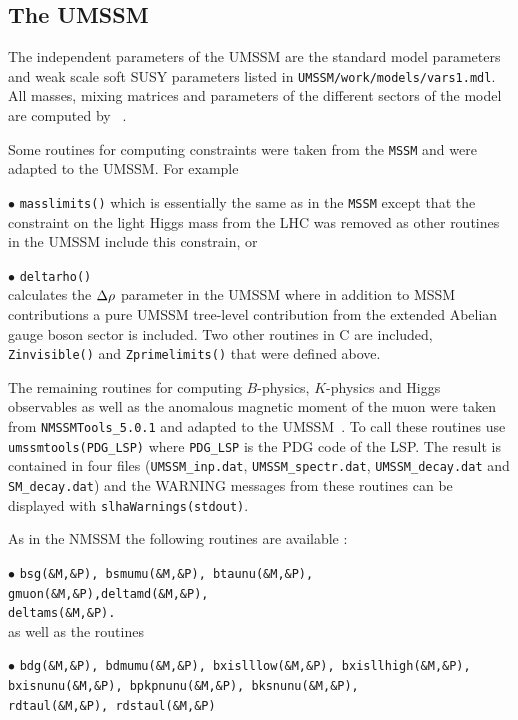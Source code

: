 \documentclass[12pt,a4paper]{article}
\begin{document}
\subsection{The UMSSM}

The independent parameters of the UMSSM are the standard model
parameters and weak scale soft SUSY parameters listed in \verb|UMSSM/work/models/vars1.mdl|.
All  masses, mixing matrices and parameters of the different sectors of the model
are computed by \micro~\cite{DaSilva:2013jga,Belanger:2015cra}.

Some routines for computing constraints were taken from the {\tt MSSM} and were adapted to the UMSSM. For example

 \noi$\bullet$ \verb|masslimits()|
which is essentially the same as in the {\tt MSSM} except that
the constraint on the light Higgs mass from the LHC was removed
as other routines in the UMSSM include this constrain, or

\noi$\bullet$ \verb|deltarho()|\\
 calculates  the $\Delta\rho$ parameter in the UMSSM where in addition to MSSM contributions
a pure UMSSM tree-level contribution from the extended Abelian gauge boson sector is included.
Two other routines in C are included, \verb|Zinvisible()| and \verb|Zprimelimits()| that were defined above. 


The remaining routines for computing $B$-physics, $K$-physics and Higgs observables as well as the anomalous magnetic moment of the muon
were taken from \verb|NMSSMTools_5.0.1| and adapted to the UMSSM~\cite{DaSilva:2013jga,Domingo:2015wyn}.
To call these routines use \verb|umssmtools(PDG_LSP)| where \verb|PDG_LSP| is the PDG code of the LSP. The result is contained in four files (\verb|UMSSM_inp.dat|,
\verb|UMSSM_spectr.dat|, \verb|UMSSM_decay.dat| and \verb|SM_decay.dat|) and the WARNING messages from these routines
can be displayed with \verb|slhaWarnings(stdout)|.

As in the NMSSM the following routines are available :

\noindent
$\bullet$ {\tt bsg(\&M,\&P), bsmumu(\&M,\&P), btaunu(\&M,\&P),  gmuon(\&M,\&P),deltamd(\&M,\&P),}\\
{\tt deltams(\&M,\&P).}\\ 

\noindent as well as the routines

\noindent
$\bullet$ {\tt bdg(\&M,\&P), bdmumu(\&M,\&P), bxislllow(\&M,\&P), bxisllhigh(\&M,\&P),}\\ 
{\tt bxisnunu(\&M,\&P), bpkpnunu(\&M,\&P), bksnunu(\&M,\&P),}\\ 
{\tt rdtaul(\&M,\&P), rdstaul(\&M,\&P)}
\end{document}
